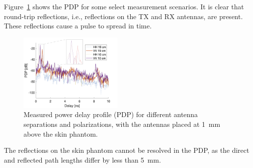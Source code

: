 \documentclass[preprint]{rsl}
\begin{document}
Figure~\ref{fig:PDP} shows the PDP for some select measurement scenarios. 
It is clear that round-trip reflections, i.e., reflections on the TX and RX antennas, are present.
These reflections cause a pulse to spread in time.
\begin{figure}[b!]
\begin{center}
	\includegraphics[width=0.45\textwidth]{figures/PDP}
\caption{Measured power delay profile (PDP) for different antenna separations and polarizations, with the antennas placed at 1~mm above the skin phantom.}
\label{fig:PDP}
\end{center}
\end{figure}
The reflections on the skin phantom cannot be resolved in the PDP, as the direct and reflected path lengths differ by less than 5~mm.
\end{document}

